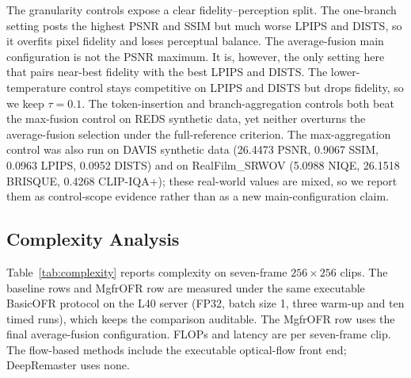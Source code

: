 \documentclass[symmetry,article,submit,pdftex,moreauthors]{Definitions/mdpi}
\begin{document}
The granularity controls expose a clear fidelity--perception split. The one-branch setting posts the highest PSNR and SSIM but much worse LPIPS and DISTS, so it overfits pixel fidelity and loses perceptual balance. The average-fusion main configuration is not the PSNR maximum. It is, however, the only setting here that pairs near-best fidelity with the best LPIPS and DISTS. The lower-temperature control stays competitive on LPIPS and DISTS but drops fidelity, so we keep $\tau=0.1$. The token-insertion and branch-aggregation controls both beat the max-fusion control on REDS synthetic data, yet neither overturns the average-fusion selection under the full-reference criterion. The max-aggregation control was also run on DAVIS synthetic data (26.4473 PSNR, 0.9067 SSIM, 0.0963 LPIPS, 0.0952 DISTS) and on RealFilm\_SRWOV (5.0988 NIQE, 26.1518 BRISQUE, 0.4268 CLIP-IQA+); these real-world values are mixed, so we report them as control-scope evidence rather than as a new main-configuration claim.

\FloatBarrier

\subsection{Complexity Analysis}
\label{subsec:complexity}

Table~\ref{tab:complexity} reports complexity on seven-frame $256{\times}256$ clips. The baseline rows and MgfrOFR row are measured under the same executable BasicOFR protocol on the L40 server (FP32, batch size 1, three warm-up and ten timed runs), which keeps the comparison auditable. The MgfrOFR row uses the final average-fusion configuration. FLOPs and latency are per seven-frame clip. The flow-based methods include the executable optical-flow front end; DeepRemaster uses none.
\end{document}
